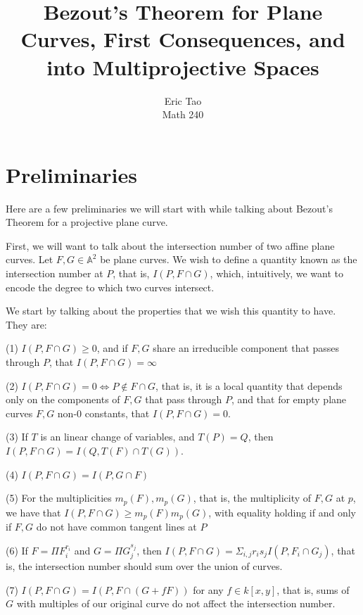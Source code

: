 \documentclass[10pt]{article}
\begin{document}
 
\title{Bezout’s Theorem for Plane Curves, First Consequences, and into Multiprojective Spaces}
\author{Eric Tao\\
Math 240}
\maketitle
 
\section{Preliminaries}

Here are a few preliminaries we will start with while talking about Bezout’s Theorem for a projective plane curve. 

First, we will want to talk about the intersection number of two affine plane curves. Let $F, G \in \mathbb{A}^2$ be plane curves. We wish to define a quantity known as the intersection number at $P$, that is, $I(P, F \cap G)$, which, intuitively, we want to encode the degree to which two curves intersect.

We start by talking about the properties that we wish this quantity to have. They are:

(1) $I(P, F \cap G) \geq 0$, and if $F, G$ share an irreducible component that passes through $P$, that $I(P, F \cap G) = \infty$

(2) $I(P, F \cap G) = 0 \iff P \not \in F \cap G$, that is, it is a local quantity that depends only on the components of $F,G$ that pass through $P$, and that for empty plane curves $F, G$ non-0 constants, that $I(P, F \cap G) = 0$.

(3) If $T$ is an linear change of variables, and $T(P) = Q$, then $I(P, F \cap G) = I(Q, T(F) \cap T(G))$.

(4) $I(P, F \cap G) = I(P, G \cap F)$

(5) For the multiplicities $m_p(F), m_p(G)$, that is, the multiplicity of $F,G$ at $p$, we have that $I(P, F \cap G) \geq m_p(F)m_p(G)$, with equality holding if and only if $F,G$ do not have common tangent lines at $P$

(6) If $F = \Pi F_i^{r_i}$ and $G = \Pi G_j^{s_j}$, then $I(P, F \cap G) = \Sigma_{i,j} r_is_j I(P,F_i \cap G_j)$, that is, the intersection number should sum over the union of curves.

(7) $I(P, F \cap G) = I(P, F \cap (G + fF))$ for any $f \in k[x,y]$, that is, sums of $G$ with multiples of our original curve do not affect the intersection number.
\end{document}
